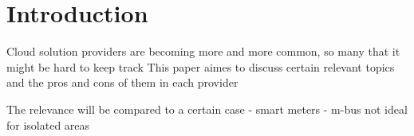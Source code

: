 \chapter{Introduction}

Cloud solution providers are becoming more and more common, so many that it might be hard to keep track
This paper aimes to discuss certain relevant topics and the pros and cons of them in each provider

The relevance will be compared to a certain case - smart meters - m-bus not ideal for isolated areas